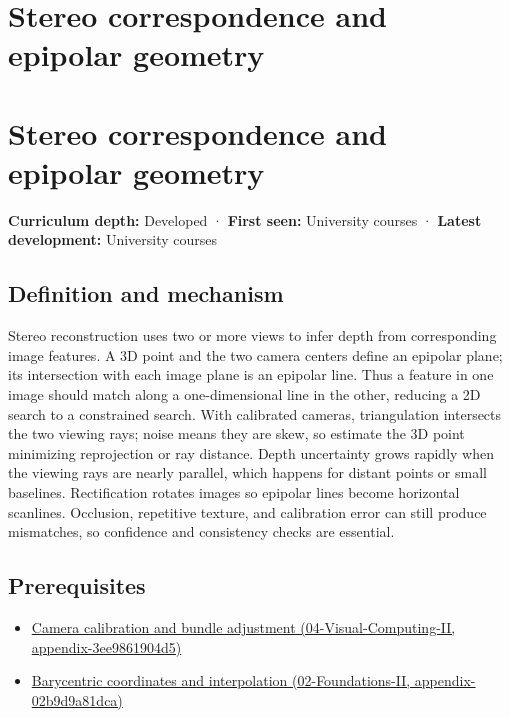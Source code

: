 \hypertarget{appendix-c4e98b6e4001}{}
\section*{Stereo correspondence and epipolar geometry}
\section{Stereo correspondence and epipolar geometry}\label{appendix-c4e98b6e4001-stereo-correspondence-and-epipolar-geometry}

\textbf{Curriculum depth:} Developed · \textbf{First seen:} University courses · \textbf{Latest development:} University courses

\subsection{Definition and mechanism}\label{appendix-c4e98b6e4001-definition-and-mechanism}

Stereo reconstruction uses two or more views to infer depth from corresponding image features. A 3D point and the two camera centers define an epipolar plane; its intersection with each image plane is an epipolar line. Thus a feature in one image should match along a one-dimensional line in the other, reducing a 2D search to a constrained search. With calibrated cameras, triangulation intersects the two viewing rays; noise means they are skew, so estimate the 3D point minimizing reprojection or ray distance. Depth uncertainty grows rapidly when the viewing rays are nearly parallel, which happens for distant points or small baselines. Rectification rotates images so epipolar lines become horizontal scanlines. Occlusion, repetitive texture, and calibration error can still produce mismatches, so confidence and consistency checks are essential.

\subsection{Prerequisites}\label{appendix-c4e98b6e4001-prerequisites}

\begin{itemize}
\tightlist
\item
  \href{../04-Visual-Computing-II/main.pdf\#nameddest=appendix-3ee9861904d5}{Camera calibration and bundle adjustment (04-Visual-Computing-II, appendix-3ee9861904d5)}
\item
  \href{../02-Foundations-II/main.pdf\#nameddest=appendix-02b9d9a81dca}{Barycentric coordinates and interpolation (02-Foundations-II, appendix-02b9d9a81dca)}
\end{itemize}

